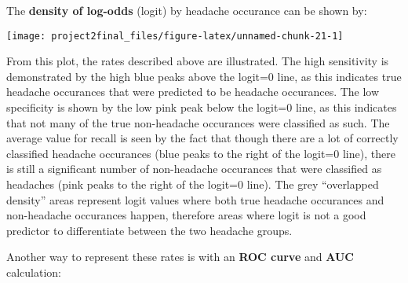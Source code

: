 \documentclass[]{article}
\newenvironment{Shaded}{\begin{snugshade}}{\end{snugshade}}
\newcommand{\DataTypeTok}[1]{\textcolor[rgb]{0.13,0.29,0.53}{#1}}
\newcommand{\DecValTok}[1]{\textcolor[rgb]{0.00,0.00,0.81}{#1}}
\newcommand{\KeywordTok}[1]{\textcolor[rgb]{0.13,0.29,0.53}{\textbf{#1}}}
\newcommand{\NormalTok}[1]{#1}
\newcommand{\OperatorTok}[1]{\textcolor[rgb]{0.81,0.36,0.00}{\textbf{#1}}}
\newcommand{\StringTok}[1]{\textcolor[rgb]{0.31,0.60,0.02}{#1}}
\begin{document}
The \textbf{density of log-odds} (logit) by headache occurance can be
shown by:

\begin{Shaded}
\end{Shaded}

\begin{center}\texttt{[image: project2final\_files/figure-latex/unnamed-chunk-21-1]} \end{center}

From this plot, the rates described above are illustrated. The high
sensitivity is demonstrated by the high blue peaks above the logit=0
line, as this indicates true headache occurances that were predicted to
be headache occurances. The low specificity is shown by the low pink
peak below the logit=0 line, as this indicates that not many of the true
non-headache occurances were classified as such. The average value for
recall is seen by the fact that though there are a lot of correctly
classified headache occurances (blue peaks to the right of the logit=0
line), there is still a significant number of non-headache occurances
that were classified as headaches (pink peaks to the right of the
logit=0 line). The grey ``overlapped density'' areas represent logit
values where both true headache occurances and non-headache occurances
happen, therefore areas where logit is not a good predictor to
differentiate between the two headache groups.

Another way to represent these rates is with an \textbf{ROC curve} and
\textbf{AUC} calculation:

\begin{Shaded}
\end{Shaded}
\end{document}
